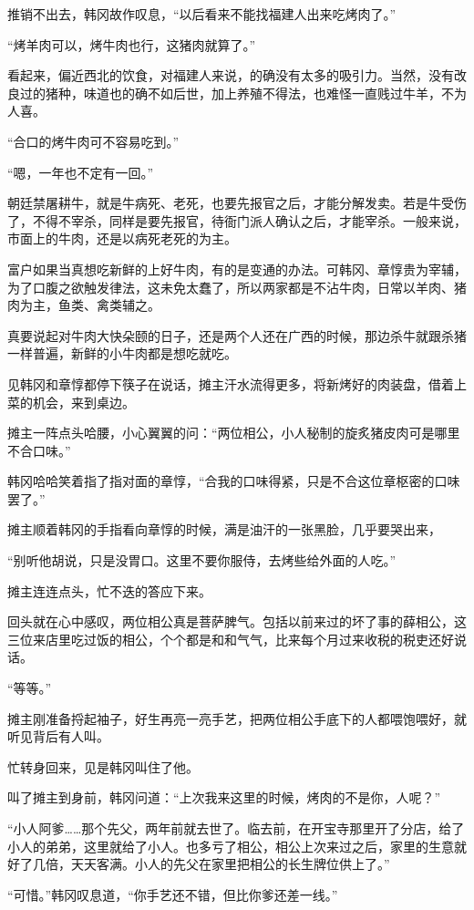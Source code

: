 推销不出去，韩冈故作叹息，“以后看来不能找福建人出来吃烤肉了。”

“烤羊肉可以，烤牛肉也行，这猪肉就算了。”

看起来，偏近西北的饮食，对福建人来说，的确没有太多的吸引力。当然，没有改良过的猪种，味道也的确不如后世，加上养殖不得法，也难怪一直贱过牛羊，不为人喜。

“合口的烤牛肉可不容易吃到。”

“嗯，一年也不定有一回。”

朝廷禁屠耕牛，就是牛病死、老死，也要先报官之后，才能分解发卖。若是牛受伤了，不得不宰杀，同样是要先报官，待衙门派人确认之后，才能宰杀。一般来说，市面上的牛肉，还是以病死老死的为主。

富户如果当真想吃新鲜的上好牛肉，有的是变通的办法。可韩冈、章惇贵为宰辅，为了口腹之欲触发律法，这未免太蠢了，所以两家都是不沾牛肉，日常以羊肉、猪肉为主，鱼类、禽类辅之。

真要说起对牛肉大快朵颐的日子，还是两个人还在广西的时候，那边杀牛就跟杀猪一样普遍，新鲜的小牛肉都是想吃就吃。

见韩冈和章惇都停下筷子在说话，摊主汗水流得更多，将新烤好的肉装盘，借着上菜的机会，来到桌边。

摊主一阵点头哈腰，小心翼翼的问：“两位相公，小人秘制的旋炙猪皮肉可是哪里不合口味。”

韩冈哈哈笑着指了指对面的章惇，“合我的口味得紧，只是不合这位章枢密的口味罢了。”

摊主顺着韩冈的手指看向章惇的时候，满是油汗的一张黑脸，几乎要哭出来，

“别听他胡说，只是没胃口。这里不要你服侍，去烤些给外面的人吃。”

摊主连连点头，忙不迭的答应下来。

回头就在心中感叹，两位相公真是菩萨脾气。包括以前来过的坏了事的薛相公，这三位来店里吃过饭的相公，个个都是和和气气，比来每个月过来收税的税吏还好说话。

“等等。”

摊主刚准备捋起袖子，好生再亮一亮手艺，把两位相公手底下的人都喂饱喂好，就听见背后有人叫。

忙转身回来，见是韩冈叫住了他。

叫了摊主到身前，韩冈问道：“上次我来这里的时候，烤肉的不是你，人呢？”

“小人阿爹……那个先父，两年前就去世了。临去前，在开宝寺那里开了分店，给了小人的弟弟，这里就给了小人。也多亏了相公，相公上次来过之后，家里的生意就好了几倍，天天客满。小人的先父在家里把相公的长生牌位供上了。”

“可惜。”韩冈叹息道，“你手艺还不错，但比你爹还差一线。”

